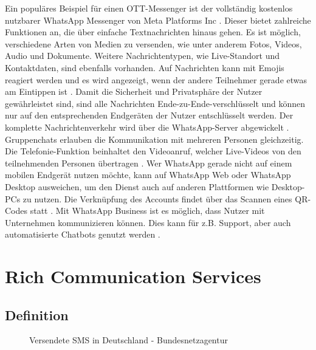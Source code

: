 \documentclass[conference]{IEEEtran}
\begin{document}
Ein populäres Beispiel für einen OTT-Messenger ist der vollständig kostenlos nutzbarer WhatsApp Messenger von Meta Platforms Inc \cite{wakostenlos}.
Dieser bietet zahlreiche Funktionen an, die über einfache Textnachrichten hinaus gehen.
Es ist möglich, verschiedene Arten von Medien zu versenden, wie unter anderem Fotos, Videos, Audio und Dokumente.
Weitere Nachrichtentypen, wie Live-Standort und Kontaktdaten, sind ebenfalls vorhanden.
Auf Nachrichten kann mit Emojis reagiert werden und es wird angezeigt, wenn der andere Teilnehmer gerade etwas am Eintippen ist \cite{wafaq}.
Damit die Sicherheit und Privatsphäre der Nutzer gewährleistet sind, sind alle Nachrichten Ende-zu-Ende-verschlüsselt und können nur auf den entsprechenden Endgeräten der Nutzer entschlüsselt werden.
Der komplette Nachrichtenverkehr wird über die WhatsApp-Server abgewickelt \cite{waencryption}.
Gruppenchats erlauben die Kommunikation mit mehreren Personen gleichzeitig. Die Telefonie-Funktion beinhaltet den Videoanruf, welcher Live-Videos von den teilnehmenden Personen übertragen \cite{wafaq}.
Wer WhatsApp gerade nicht auf einem mobilen Endgerät nutzen möchte, kann auf WhatsApp Web oder WhatsApp Desktop ausweichen, um den Dienst auch auf anderen Plattformen wie Desktop-PCs zu nutzen.
Die Verknüpfung des Accounts findet über das Scannen eines QR-Codes statt \cite{wafaq,waencryption}.
Mit WhatsApp Business ist es möglich, dass Nutzer mit Unternehmen kommunizieren können. Dies kann für z.B. Support, aber auch automatisierte Chatbots genutzt werden \cite{wafaq}.


\section{Rich Communication Services}

\subsection{Definition}

\begin{figure}
    \centerline{}
    \caption{Versendete SMS in Deutschland - Bundesnetzagentur \cite{smsstats}}
    \label{versendetesms}
\end{figure}
\end{document}

